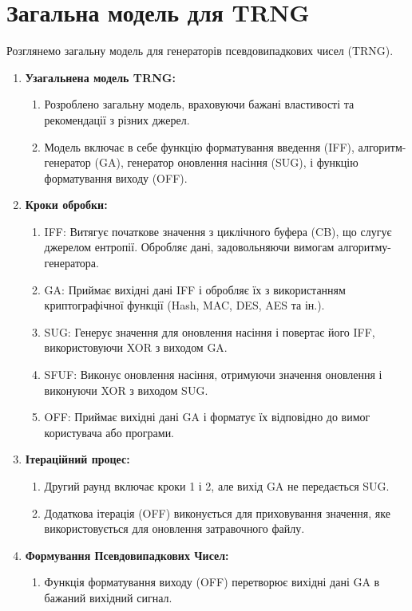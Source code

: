 \section{Загальна модель для TRNG}

Розглянемо загальну модель для генераторів псевдовипадкових чисел (TRNG).

\begin{enumerate}
    \item \textbf{Узагальнена модель TRNG:}
    \begin{enumerate}
        \item Розроблено загальну модель, враховуючи бажані властивості та рекомендації з різних джерел.
        \item Модель включає в себе функцію форматування введення (IFF), алгоритм-генератор (GA), генератор оновлення насіння (SUG), і функцію форматування виходу (OFF).
    \end{enumerate}

    \item \textbf{Кроки обробки:}
    \begin{enumerate}
        \item IFF: Витягує початкове значення з циклічного буфера (CB), що слугує джерелом ентропії. Обробляє дані, задовольняючи вимогам алгоритму-генератора.
        \item GA: Приймає вихідні дані IFF і обробляє їх з використанням криптографічної функції (Hash, MAC, DES, AES та ін.).
        \item SUG: Генерує значення для оновлення насіння і повертає його IFF, використовуючи XOR з виходом GA.
        \item SFUF: Виконує оновлення насіння, отримуючи значення оновлення і виконуючи XOR з виходом SUG.
        \item OFF: Приймає вихідні дані GA і форматує їх відповідно до вимог користувача або програми.
    \end{enumerate}

    \item \textbf{Ітераційний процес:}
    \begin{enumerate}
        \item Другий раунд включає кроки 1 і 2, але вихід GA не передається SUG.
        \item Додаткова ітерація (OFF) виконується для приховування значення, яке використовується для оновлення затравочного файлу.
    \end{enumerate}

    \item \textbf{Формування Псевдовипадкових Чисел:}
    \begin{enumerate}
        \item Функція форматування виходу (OFF) перетворює вихідні дані GA в бажаний вихідний сигнал.
    \end{enumerate}
\end{enumerate}

